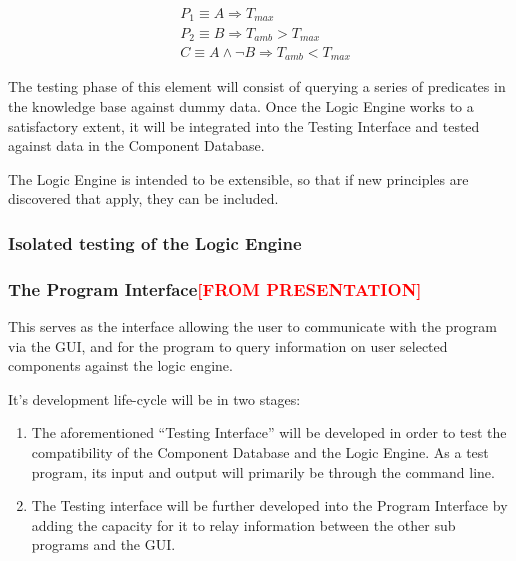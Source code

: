 
\begin{equation}
\begin{split}
&P_1 \equiv A \Rightarrow T_{max} \\
&P_2 \equiv B \Rightarrow T_{amb} > T_{max} \\
&C \equiv A \land \neg B \Rightarrow T_{amb} < T_{max}
\end{split}
\end{equation}


The testing phase of this element will consist of querying a series of predicates in the knowledge base against dummy data. Once the Logic Engine works to a satisfactory extent, it will be integrated into the Testing Interface and tested against data in the Component Database.

The Logic Engine is intended to be extensible, so that if new principles are discovered that apply, they can be included.

\subsubsection{Isolated testing of the Logic Engine}

\subsubsection{The Program Interface\textcolor{red}{[FROM PRESENTATION]}}
\label{sec:Methodology:TechnicalOverview:TheProgramInterface}
This serves as the interface allowing the user to communicate with 
the program via the GUI, and for the program to query information on 
user selected components
against the logic engine.

It's development life-cycle will be in two stages:

\begin{enumerate}

\item The aforementioned “Testing Interface” will be developed in order to test the compatibility 
of the Component Database and the Logic Engine. As a test program, its input and output 
will primarily be through the command line.

\item The Testing interface will be further developed into the Program Interface by adding the
capacity for it to relay information between the other sub programs and the GUI.

\end{enumerate} 

